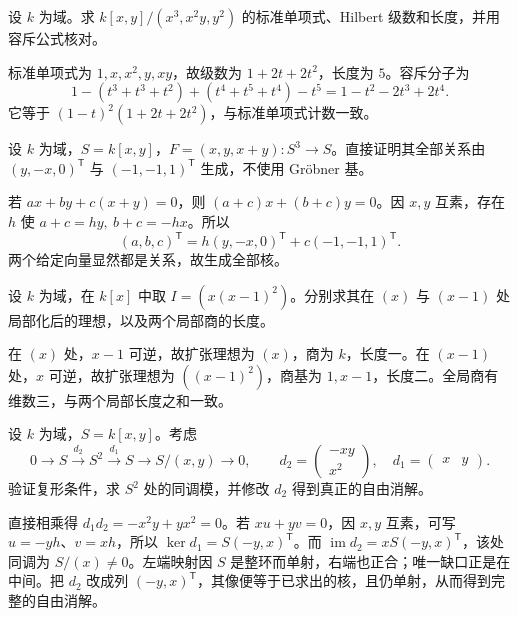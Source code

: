 \begin{exercise}\label{b3:ex:B-monomial-series}
	设 \(k\) 为域。求 \(k[x,y]/(x^3,x^2y,y^2)\) 的标准单项式、Hilbert 级数和长度，并用容斥公式核对。
\end{exercise}
\begin{solution}
	标准单项式为 \(1,x,x^2,y,xy\)，故级数为 \(1+2t+2t^2\)，长度为 \(5\)。容斥分子为
	\[
		1-(t^3+t^3+t^2)+(t^4+t^5+t^4)-t^5 =1-t^2-2t^3+2t^4.
	\]
	它等于 \((1-t)^2(1+2t+2t^2)\)，与标准单项式计数一致。
\end{solution}

\begin{exercise}\label{b3:ex:B-module-change}
	设 \(k\) 为域，\(S=k[x,y]\)，\(F=(x,y,x+y):S^3\rightarrow S\)。直接证明其全部关系由 \((y,-x,0)^{\mathsf T}\) 与 \((-1,-1,1)^{\mathsf T}\) 生成，不使用 Gröbner 基。
\end{exercise}
\begin{solution}
	若 \(ax+by+c(x+y)=0\)，则 \((a+c)x+(b+c)y=0\)。因 \(x,y\) 互素，存在 \(h\) 使 \(a+c=hy,\ b+c=-hx\)。所以
	\[
		(a,b,c)^{\mathsf T} =h(y,-x,0)^{\mathsf T}+c(-1,-1,1)^{\mathsf T}.
	\]
	两个给定向量显然都是关系，故生成全部核。
\end{solution}

\begin{exercise}\label{b3:ex:B-local-vs-global}
	设 \(k\) 为域，在 \(k[x]\) 中取 \(I=(x(x-1)^2)\)。分别求其在 \((x)\) 与 \((x-1)\) 处局部化后的理想，以及两个局部商的长度。
\end{exercise}
\begin{solution}
	在 \((x)\) 处，\(x-1\) 可逆，故扩张理想为 \((x)\)，商为 \(k\)，长度一。在 \((x-1)\) 处，\(x\) 可逆，故扩张理想为 \(((x-1)^2)\)，商基为 \(1,x-1\)，长度二。全局商有维数三，与两个局部长度之和一致。
\end{solution}

\begin{exercise}\label{b3:ex:B-complex-not-resolution}
	设 \(k\) 为域，\(S=k[x,y]\)。考虑
	\[
		0\longrightarrow S\xrightarrow{\,d_2\,}S^2 \xrightarrow{\,d_1\,}S\longrightarrow S/(x,y)\longrightarrow0, \qquad
		d_2=\begin{pmatrix}-xy\\x^2\end{pmatrix},\quad d_1=\begin{pmatrix}x&y\end{pmatrix}.
	\]
	验证复形条件，求 \(S^2\) 处的同调模，并修改 \(d_2\) 得到真正的自由消解。
\end{exercise}
\begin{solution}
	直接相乘得 \(d_1d_2=-x^2y+yx^2=0\)。若 \(xu+yv=0\)，因 \(x,y\) 互素，可写 \(u=-yh\)、\(v=xh\)，所以 \(\ker d_1=S(-y,x)^{\mathsf T}\)。而 \(\operatorname{im}d_2=xS(-y,x)^{\mathsf T}\)，该处同调为 \(S/(x)\ne0\)。左端映射因 \(S\) 是整环而单射，右端也正合；唯一缺口正是在中间。把 \(d_2\) 改成列 \((-y,x)^{\mathsf T}\)，其像便等于已求出的核，且仍单射，从而得到完整的自由消解。
\end{solution}
